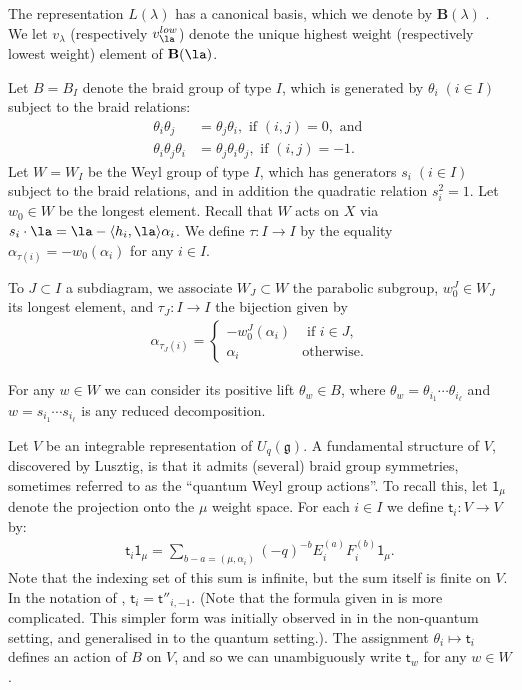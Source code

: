 \documentclass[11pt,reqno]{amsart}
\numberwithin{equation}{section}
\theoremstyle{definition}
\theoremstyle{named}
\newcommand{\bB}{\mathbf{B}}
\newcommand{\fg}{\mathfrak{g}}
\newcommand{\st}{\mathsf{t}}
\newcommand{\sone}{\mathsf{1}}
\begin{document}
The representation $L(\lambda)$ has a canonical basis, which we denote by $\bB(\lambda)$ \cite{Lusbook}.  We let $v_\lambda$ (respectively $v_\la^{low}$) denote the unique highest weight (respectively lowest weight) element of $\bB(\la)$.





Let $B=B_I$ denote the braid group of type $I$, which is generated by $\theta_i\; (i\in I)$ subject to the braid relations:
\begin{align*}
    \theta_i\theta_j &=\theta_j\theta_i, \text{ if } (i,j)=0, \text{ and }\\
    \theta_i\theta_j\theta_i&=\theta_j\theta_i\theta_j, \text{ if } (i,j)=-1.
\end{align*}
Let $W=W_I$ be the Weyl group of type $I$, which has generators $s_i\; (i\in I)$ subject to the braid relations,  and in addition the quadratic relation $s_i^2=1$.  Let $w_0\in W$  be the longest element.  Recall that $W$ acts on $X$ via $s_i\cdot \la=\la-\langle h_i, \la\rangle\alpha_i$.  We define $\tau: I\to I$ by the equality $
\alpha_{\tau(i)}=-w_0(\alpha_i)$  for any $i \in I$.


To $J \subset I$ a subdiagram, we associate $W_J \subset W$  the parabolic subgroup, $w_0^J\in W_J$  its longest element, and $\tau_J:I\to I$  the bijection given by
\begin{align*}
\alpha_{\tau_J(i)}= \begin{cases} -w_0^J(\alpha_i) &\text{ if } i \in J,\\
\alpha_i &\text{otherwise.} \end{cases}
\end{align*}

For any $w\in W$ we can consider its positive lift $\theta_w\in B$, where $\theta_w=\theta_{i_1}\cdots \theta_{i_\ell}$ and $w=s_{i_1}\cdots s_{i_\ell}$ is any reduced decomposition.






Let $V$ be an integrable representation of $U_q(\fg)$.
A fundamental structure of $V$, discovered by Lusztig, is that it admits (several) braid group symmetries, sometimes referred to as the ``quantum Weyl group actions''.  To recall this, let $\sone_\mu$ denote the projection onto the $\mu$ weight space.  For each $i\in I$ we define $\st_i:V\to V$ by:
\begin{align}
    \st_i\sone_\mu=\sum_{b-a=(\mu,\alpha_i)}(-q)^{-b}E_i^{(a)}F_i^{(b)}\sone_\mu.
\end{align}
Note that the indexing set of this sum is infinite, but the sum itself is finite on $V$.
In the notation of \cite{Lusbook}, $\st_i=\st''_{i,-1}$.  (Note that the formula given in \cite{Lusbook} is more complicated. This simpler form was initially observed in \cite{CR} in the non-quantum setting, and generalised in \cite{CKM} to the quantum setting.). The assignment $\theta_i \mapsto \st_i$ defines an action of $B$ on $V$, and so we can unambiguously write $\st_w$ for any $w\in W$.  
\end{document}
